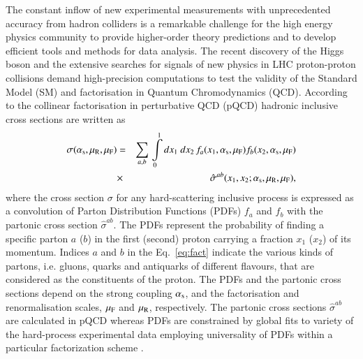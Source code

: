 The constant inflow of new experimental measurements 
with unprecedented accuracy from hadron colliders is a remarkable challenge 
for the high energy physics community to provide higher-order theory 
predictions and to develop efficient tools and methods for data analysis.
The recent discovery of the Higgs boson \cite{Aad:2012tfa,Chatrchyan:2012ufa} 
and the extensive searches
for signals of new physics in LHC proton-proton collisions
demand high-precision computations to test the validity of the Standard Model (SM)
and factorisation in Quantum Chromodynamics (QCD).
According to the collinear factorisation in perturbative QCD (pQCD)
hadronic inclusive cross sections are written as
%
\begin{eqnarray}
\small
\sigma(\alpha_\mathrm{s},\mu_\mathrm{R},\mu_\mathrm{F})&=& \sum\limits_{a,b}\,  \int\limits_{0}\limits^{1} dx_1\ dx_2\, f_a(x_1,\alpha_\mathrm{s},\mu_\mathrm{F}) 
 f_b(x_2,\alpha_\mathrm{s},\mu_\mathrm{F}) \nonumber \\ 
&\times&  \, \hat{\sigma}^{ab}(x_1,x_2;\alpha_\mathrm{s},\mu_\mathrm{R},\mu_\mathrm{F}),
\label{eq:fact}
\end{eqnarray}
where the cross section $\sigma$ for 
any hard-scattering inclusive process
is expressed
as a convolution of Parton Distribution Functions (PDFs) $f_a$ and $f_b$
with the partonic cross section
$\hat{\sigma}^{ab}$.
%
The PDFs represent 
the probability of finding a specific parton $a$ ($b$) in the first (second) proton carrying a fraction $x_1$ ($x_2$) of its momentum.
%
Indices $a$ and $b$ in the Eq.~\ref{eq:fact} indicate the various 
kinds of partons,
i.e. gluons, quarks and antiquarks of different flavours, 
that are considered
as the constituents of the proton.
%
The PDFs and the partonic cross sections depend on the strong coupling
$\alpha_\mathrm{s}$, and the factorisation and renormalisation scales,
$\mu_\mathrm{F}$ and $\mu_\mathrm{R}$, respectively.
%
The partonic cross sections $\hat\sigma^{ab}$ are calculated in pQCD whereas
PDFs are constrained by global fits to variety of the hard-process experimental data employing
universality of PDFs within a particular factorization scheme \cite{Perez:2012um,Forte:2013wc}. 
%
%

